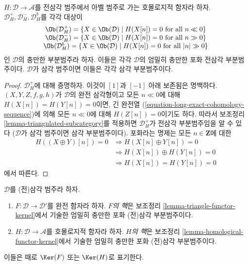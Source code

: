 \begin{lemma}
\label{lemma-homological-functor-bounded}
$H : \mathcal{D} \to \mathcal{A}$를 전삼각 범주에서 아벨 범주로 가는
호몰로지적 함자라 하자. $\mathcal{D}_H^{+}, \mathcal{D}_H^{-},
\mathcal{D}_H^b$를 각각 대상이
$$
\begin{matrix}
\Ob(\mathcal{D}_H^{+}) =
\{X \in \Ob(\mathcal{D}) \mid
H(X[n]) = 0\text{ for all }n \ll 0\} \\
\Ob(\mathcal{D}_H^{-}) =
\{X \in \Ob(\mathcal{D}) \mid
H(X[n]) = 0\text{ for all }n \gg 0\} \\
\Ob(\mathcal{D}_H^b) =
\{X \in \Ob(\mathcal{D}) \mid
H(X[n]) = 0\text{ for all }|n| \gg 0\}
\end{matrix}
$$
인 $\mathcal{D}$의 충만한 부분범주라 하자. 이들은 각각
$\mathcal{D}$의 엄밀히 충만한 포화 전삼각 부분범주이다.
$\mathcal{D}$가 삼각 범주이면 이들은 각각 삼각 부분범주이다.
\end{lemma}

\begin{proof}
$\mathcal{D}_H^{+}$에 대해 증명하자. 이것이 $[1]$과 $[-1]$ 아래
보존됨은 명백하다. $(X, Y, Z, f, g, h)$가 $\mathcal{D}$의 완전
삼각형이고 모든 $n \ll 0$에 대해 $H(X[n]) = H(Y[n]) = 0$이면,
긴 완전열 (\ref{equation-long-exact-cohomology-sequence})에 의해
모든 $n \ll 0$에 대해 $H(Z[n]) = 0$이기도 하다. 따라서 보조정리
\ref{lemma-triangulated-subcategory}를 적용하면
$\mathcal{D}_H^{+}$가 전삼각 부분범주임을 알 수 있다
($\mathcal{D}$가 삼각 범주이면 삼각 부분범주이다). 포화라는 명제는
모든 $n \in \mathbf{Z}$에 대한
\begin{align*}
H((X \oplus Y)[n]) = 0 & \Rightarrow H(X[n] \oplus Y[n]) = 0 \\
& \Rightarrow H(X[n]) \oplus H(Y[n]) = 0 \\
& \Rightarrow H(X[n]) = H(Y[n]) = 0
\end{align*}
에서 따른다.
\end{proof}

\begin{definition}
\label{definition-kernel-category}
$\mathcal{D}$를 (전)삼각 범주라 하자.
\begin{enumerate}
\item $F : \mathcal{D} \to \mathcal{D}'$를 완전 함자라 하자.
{\it $F$의 핵}은 보조정리 \ref{lemma-triangle-functor-kernel}에서
기술한 엄밀히 충만한 포화 (전)삼각 부분범주이다.
\item $H : \mathcal{D} \to \mathcal{A}$를 호몰로지적 함자라 하자.
{\it $H$의 핵}은 보조정리 \ref{lemma-homological-functor-kernel}에서
기술한 엄밀히 충만한 포화 (전)삼각 부분범주이다.
\end{enumerate}
이들은 때로 $\Ker(F)$ 또는 $\Ker(H)$로 표기한다.
\end{definition}

